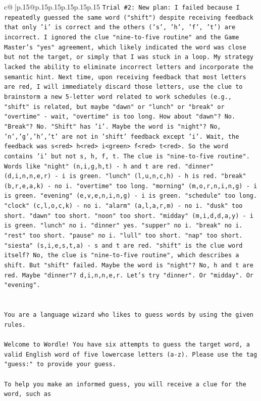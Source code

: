 \documentclass{article}
\begin{document}
{\begin{supertabular}{c@{$\;$}|p{.15\linewidth}@{}p{.15\linewidth}p{.15\linewidth}p{.15\linewidth}p{.15\linewidth}p{.15\linewidth}}
{{{\texttt{Trial \#2: New plan: I failed because I repeatedly guessed the same word ("shift") despite receiving feedback that only 'i' is correct and the others ('s', 'h', 'f', 't') are incorrect. I ignored the clue "nine{-}to{-}five routine" and the Game Master's "yes" agreement, which likely indicated the word was close but not the target, or simply that I was stuck in a loop. My strategy lacked the ability to eliminate incorrect letters and incorporate the semantic hint. Next time, upon receiving feedback that most letters are red, I will immediately discard those letters, use the clue to brainstorm a new 5{-}letter word related to work schedules (e.g., "shift" is related, but maybe "dawn" or "lunch" or "break" or "overtime" {-} wait, "overtime" is too long. How about "dawn"? No. "Break"? No. "Shift" has 'i'. Maybe the word is "night"? No, 'n','g','h','t' are not in 'shift' feedback except 'i'. Wait, the feedback was s<red> h<red> i<green> f<red> t<red>. So the word contains 'i' but not s, h, f, t. The clue is "nine{-}to{-}five routine". Words like "night" (n,i,g,h,t) {-} h and t are red. "dinner" (d,i,n,n,e,r) {-} i is green. "lunch" (l,u,n,c,h) {-} h is red. "break" (b,r,e,a,k) {-} no i. "overtime" too long. "morning" (m,o,r,n,i,n,g) {-} i is green. "evening" (e,v,e,n,i,n,g) {-} i is green. "schedule" too long. "clock" (c,l,o,c,k) {-} no i. "alarm" (a,l,a,r,m) {-} no i. "dusk" too short. "dawn" too short. "noon" too short. "midday" (m,i,d,d,a,y) {-} i is green. "lunch" no i. "dinner" yes. "supper" no i. "break" no i. "rest" too short. "pause" no i. "lull" too short. "nap" too short. "siesta" (s,i,e,s,t,a) {-} s and t are red. "shift" is the clue word itself? No, the clue is "nine{-}to{-}five routine", which describes a shift. But "shift" failed. Maybe the word is "night"? No, h and t are red. Maybe "dinner"? d,i,n,n,e,r. Let's try "dinner". Or "midday". Or "evening".} \\
\\ 
\\ 
\texttt{You are a language wizard who likes to guess words by using the given rules.} \\
\\ 
\texttt{Welcome to Wordle! You have six attempts to guess the target word, a valid English word of five lowercase letters (a{-}z). Please use the tag "guess:" to provide your guess.} \\
\\ 
\texttt{To help you make an informed guess, you will receive a clue for the word, such as} \\
}}}
\end{supertabular}}
\end{document}

